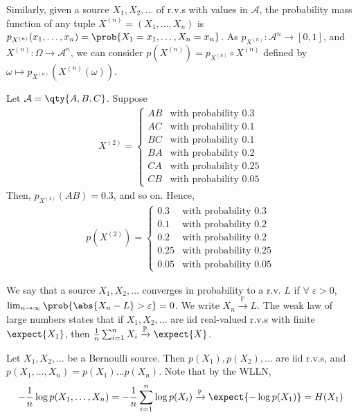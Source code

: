 Similarly, given a source $X_1, X_2, \dots$ of r.v.s with values in $\mathcal A$, the probability mass function of any tuple $X^{(n)} = (X_1, \dots, X_n)$ is $p_{X^{(n)}}(x_1, \dots, x_n) = \prob{X_1 = x_1, \dots, X_n = x_n}$.
As $p_{X^{(n)}} \colon \mathcal A^n \to [0,1]$, and $X^{(n)} \colon \Omega \to \mathcal A^n$, we can consider $p(X^{(n)}) = p_{X^{(n)}} \circ X^{(n)}$ defined by $\omega \mapsto p_{X^{(n)}}(X^{(n)}(\omega))$.

\begin{example}
    Let $\mathcal A = \qty{A, B, C}$.
    Suppose
    \begin{align*}
        X^{(2)} = \begin{cases}
        AB & \text{with probability } 0.3 \\
        AC & \text{with probability } 0.1 \\
        BC & \text{with probability } 0.1 \\
        BA & \text{with probability } 0.2 \\
        CA & \text{with probability } 0.25 \\
        CB & \text{with probability } 0.05
    \end{cases}
    \end{align*}
    Then, $p_{X^{(2)}}(AB) = 0.3$, and so on.
    Hence,
    \begin{align*}
        p(X^{(2)}) = \begin{cases}
        0.3 & \text{with probability } 0.3 \\
        0.1 & \text{with probability } 0.2 \\
        0.2 & \text{with probability } 0.2 \\
        0.25 & \text{with probability } 0.25 \\
        0.05 & \text{with probability } 0.05
    \end{cases}
    \end{align*}
\end{example}

We say that a source $X_1,X_2, \dots$ converges in probability to a r.v. $L$ if $\forall \; \varepsilon > 0$, $\lim_{n \to \infty} \prob{\abs{X_n - L} > \varepsilon} = 0$.
We write $X_n \xrightarrow{\mathbb P} L$.
The weak law of large numbers states that if $X_1, X_2, \dots$ are iid real-valued r.v.s with finite $\expect{X_1}$, then $\frac{1}{n} \sum_{i=1}^n X_i \xrightarrow{\mathbb P} \expect{X}$.

\begin{example}
    Let $X_1, X_2, \dots$ be a Bernoulli source.
    Then $p(X_1), p(X_2), \dots$ are iid r.v.s, and $p(X_1, \dots, X_n) = p(X_1) \dots p(X_n)$.
    Note that by the WLLN,
    \begin{align*}
        -\frac{1}{n} \log p(X_1, \dots, X_n) = -\frac{1}{n} \sum_{i=1}^n \log p(X_i) \xrightarrow{\mathbb P} \expect{-\log p(X_1)} = H(X_1)
    \end{align*}
\end{example}

